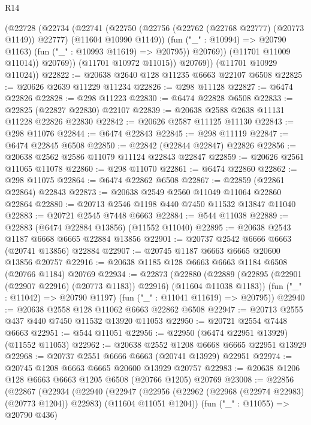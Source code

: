 \begin{lexlean}{R14}
\begin{coremodule}
{{{{{{{{{{{{{{{{{{{{{{{{{{{{{{{{{{{{{{{{{{{{{{{{{{{{{{{{{{{{{{{{{{{{{{{{{{{{{{{{{{                  (@22728
                    (@22734
                      (@22741
                        (@22750
                          (@22756 (@22762 (@22768 @22777) (@20773 @1149)) @22777)
                          (@11604 @10990 @1149))
                        (fun ("_" : @10994) => @20790 @1163)
                        (fun ("_" : @10993 @11619) => @20795))
                      @20769))
                  (@11701 @11009 @11014))
                @20769))
            (@11701 @10972 @11015))
          @20769))
      (@11701 @10929 @11024))
@22822 := @20638 @2640 @128 @11235 @6663 @22107 @6508
@22825 := @20626 @2639 @11229 @11234
@22826 := @298 @11128
@22827 := @6474 @22826
@22828 := @298 @11223
@22830 := @6474 @22828 @6508
@22833 := @22825 (@22827 @22830) @22107
@22839 := @20638 @2588 @2638 @11131 @11228 @22826 @22830
@22842 := @20626 @2587 @11125 @11130
@22843 := @298 @11076
@22844 := @6474 @22843
@22845 := @298 @11119
@22847 := @6474 @22845 @6508
@22850 := @22842 (@22844 @22847) @22826
@22856 := @20638 @2562 @2586 @11079 @11124 @22843 @22847
@22859 := @20626 @2561 @11065 @11078
@22860 := @298 @11070
@22861 := @6474 @22860
@22862 := @298 @11075
@22864 := @6474 @22862 @6508
@22867 := @22859 (@22861 @22864) @22843
@22873 := @20638 @2549 @2560 @11049 @11064 @22860 @22864
@22880 := @20713 @2546 @1198 @440 @7450 @11532 @13847 @11040
@22883 := @20721 @2545 @7448 @6663
@22884 := @544 @11038
@22889 := @22883 (@6474 @22884 @13856) (@11552 @11040)
@22895 := @20638 @2543 @1187 @6668 @6665 @22884 @13856
@22901 := @20737 @2542 @6666 @6663 (@20741 @13856) @22884
@22907 := @20745 @1187 @6663 @6665 @20600 @13856 @20757
@22916 := @20638 @1185 @128 @6663 @6663 @1184 @6508 (@20766 @1184) @20769
@22934 := @22873
    (@22880
      (@22889 (@22895 (@22901 (@22907 @22916) (@20773 @1183)) @22916) (@11604 @11038 @1183))
      (fun ("_" : @11042) => @20790 @1197)
      (fun ("_" : @11041 @11619) => @20795))
@22940 := @20638 @2558 @128 @11062 @6663 @22862 @6508
@22947 := @20713 @2555 @437 @440 @7450 @11532 @13920 @11053
@22950 := @20721 @2554 @7448 @6663
@22951 := @544 @11051
@22956 := @22950 (@6474 @22951 @13929) (@11552 @11053)
@22962 := @20638 @2552 @1208 @6668 @6665 @22951 @13929
@22968 := @20737 @2551 @6666 @6663 (@20741 @13929) @22951
@22974 := @20745 @1208 @6663 @6665 @20600 @13929 @20757
@22983 := @20638 @1206 @128 @6663 @6663 @1205 @6508 (@20766 @1205) @20769
@23008 := @22856
    (@22867
      (@22934
        (@22940
          (@22947
            (@22956 (@22962 (@22968 (@22974 @22983) (@20773 @1204)) @22983) (@11604 @11051 @1204))
            (fun ("_" : @11055) => @20790 @436)
}}}}}}}}}}}}}}}}}}}}}}}}}}}}}}}}}}}}}}}}}}}}}}}}}}}}}}}}}}}}}}}}}}}}}}}}}}}}}}}}}}
\end{coremodule}
\end{lexlean}
